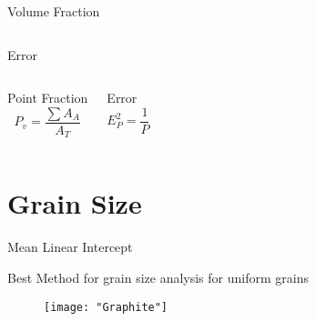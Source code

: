 \documentclass[10pt]{beamer}
\begin{document}
{\begin{frame}[fragile]{Volume Fraction}
\begin{columns}[T,onlytextwidth]
\begin{block}{Error}
\end{block}

\end{columns}

  \begin{columns}[T,onlytextwidth]
\begin{block}{Point Fraction}
\begin{equation*}
P_{v} = \dfrac{\sum A_{A}}{A_{T}}
\end{equation*} 
\end{block}
 

\begin{block}{Error}
\begin{equation*}
E_{P}^{2} = \dfrac{1}{P}
\end{equation*} 
\end{block}

\end{columns}


 
    
\end{frame}
}
\section{Grain Size}

{%
\begin{frame}[fragile]{Mean Linear Intercept}

Best Method for grain size analysis for uniform grains

\begin{figure}[H]
\texttt{[image: "Graphite"]}
\end{figure}
    
\end{frame}
}
\end{document}
